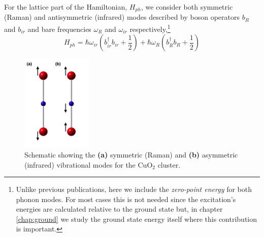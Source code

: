 For the lattice  part of the Hamiltonian, $H_{ph}$, we consider both symmetric (Raman) and antisymmetric (infrared) modes described by boson operators $b_R$ and $b_{ir}$ and bare frequencies $\omega_R$ and $\omega_{ir}$ respectively,\footnote{Unlike previous publications, here we include the \textit{zero-point energy} for both phonon modes. 
For most cases this is not needed since the excitation's energies are calculated relative to the ground state but, in chapter \ref{chap:ground} we study the ground state energy itself where this contribution is important.}
%
\begin{equation}
 \label{eq:phonon-part}
 H_{ph} = \hbar \omega_{ir}\left(b_{ir}^\dagger b_{ir}+\frac{1}{2}\right) + \hbar \omega_R \left( b_R^\dagger b_R + \frac{1}{2}\right)
\end{equation}
%
\begin{figure}[ht]
  \centering
  \includegraphics[width=0.3\textwidth]{images/CuO2-vibrations.png}
  \caption{Schematic showing the \textbf{(a)} symmetric (Raman) and \textbf{(b)} asymmetric (infrared) vibrational modes for the CuO$_2$ cluster.}
  \label{fig:CO2-vibrations}
\end{figure}

